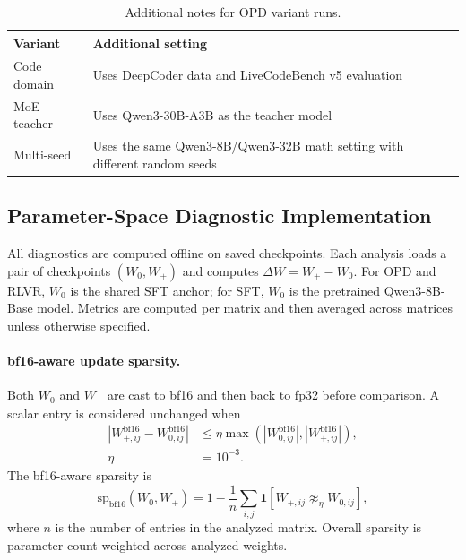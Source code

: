 \begin{table}[t]
\centering
\small
\setlength{\tabcolsep}{4pt}
\renewcommand{\arraystretch}{1.08}
\begin{tabularx}{\linewidth}{@{}lX@{}}
\toprule
\textbf{Variant} & \textbf{Additional setting} \\
\midrule
Code domain & Uses DeepCoder data  and LiveCodeBench v5 evaluation \\
MoE teacher & Uses Qwen3-30B-A3B as the teacher model \\
Multi-seed & Uses the same Qwen3-8B/Qwen3-32B math setting with different random seeds \\
\bottomrule
\end{tabularx}
\caption{Additional notes for OPD variant runs.}
\label{tab:opd-variant-notes}
\end{table}

\subsection{Parameter-Space Diagnostic Implementation}
\label{app:diagnostic-implementation}

All diagnostics are computed offline on saved checkpoints. Each analysis
loads a pair of checkpoints $(W_0,W_+)$ and computes
$\Delta W = W_+ - W_0$. For OPD and RLVR, $W_0$ is the shared SFT anchor;
for SFT, $W_0$ is the pretrained Qwen3-8B-Base model. Metrics are computed
per matrix and then averaged across matrices unless otherwise specified.

\paragraph{bf16-aware update sparsity.}
Both $W_0$ and $W_+$ are cast to bf16 and then back to fp32 before
comparison. A scalar entry is considered unchanged when
\[
\begin{aligned}
    |W_{+,ij}^{\mathrm{bf16}} - W_{0,ij}^{\mathrm{bf16}}|
    &\le
    \eta
    \max\!\left(
    |W_{0,ij}^{\mathrm{bf16}}|,
    |W_{+,ij}^{\mathrm{bf16}}|
    \right), \\
    \eta &= 10^{-3}.
\end{aligned}
\]
The bf16-aware sparsity is
\[
    \mathrm{sp}_{\mathrm{bf16}}(W_0,W_+)
    =
    1 -
    \frac{1}{n}
    \sum_{i,j}
    \mathbf{1}\!\left[
    W_{+,ij}\not\approx_{\eta} W_{0,ij}
    \right],
\]
where $n$ is the number of entries in the analyzed matrix. Overall sparsity
is parameter-count weighted across analyzed weights.

